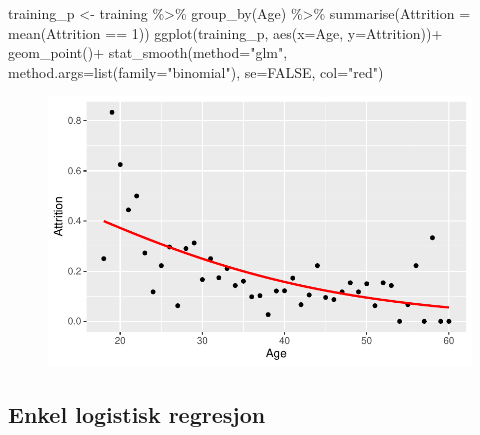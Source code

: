 \documentclass[
  letterpaper,
  DIV=11,
  numbers=noendperiod]{scrreprt}
\newenvironment{Shaded}{\begin{snugshade}}{\end{snugshade}}
\newcommand{\AttributeTok}[1]{\textcolor[rgb]{0.40,0.45,0.13}{#1}}
\newcommand{\ConstantTok}[1]{\textcolor[rgb]{0.56,0.35,0.01}{#1}}
\newcommand{\DecValTok}[1]{\textcolor[rgb]{0.68,0.00,0.00}{#1}}
\newcommand{\FunctionTok}[1]{\textcolor[rgb]{0.28,0.35,0.67}{#1}}
\newcommand{\NormalTok}[1]{\textcolor[rgb]{0.00,0.23,0.31}{#1}}
\newcommand{\OtherTok}[1]{\textcolor[rgb]{0.00,0.23,0.31}{#1}}
\newcommand{\SpecialCharTok}[1]{\textcolor[rgb]{0.37,0.37,0.37}{#1}}
\newcommand{\StringTok}[1]{\textcolor[rgb]{0.13,0.47,0.30}{#1}}
\theoremstyle{definition}
\theoremstyle{remark}
\begin{document}
\begin{Shaded}
\begin{Highlighting}[]
\NormalTok{training\_p }\OtherTok{\textless{}{-}}\NormalTok{ training }\SpecialCharTok{\%\textgreater{}\%} 
  \FunctionTok{group\_by}\NormalTok{(Age) }\SpecialCharTok{\%\textgreater{}\%} 
  \FunctionTok{summarise}\NormalTok{(}\AttributeTok{Attrition =} \FunctionTok{mean}\NormalTok{(Attrition }\SpecialCharTok{==} \DecValTok{1}\NormalTok{)) }
\FunctionTok{ggplot}\NormalTok{(training\_p, }\FunctionTok{aes}\NormalTok{(}\AttributeTok{x=}\NormalTok{Age, }\AttributeTok{y=}\NormalTok{Attrition))}\SpecialCharTok{+} 
  \FunctionTok{geom\_point}\NormalTok{()}\SpecialCharTok{+} 
  \FunctionTok{stat\_smooth}\NormalTok{(}\AttributeTok{method=}\StringTok{"glm"}\NormalTok{, }\AttributeTok{method.args=}\FunctionTok{list}\NormalTok{(}\AttributeTok{family=}\StringTok{"binomial"}\NormalTok{), }\AttributeTok{se=}\ConstantTok{FALSE}\NormalTok{, }\AttributeTok{col=}\StringTok{"red"}\NormalTok{) }
\end{Highlighting}
\end{Shaded}

\begin{figure}[H]

{\centering \includegraphics{./logistisk_regresjon_files/figure-pdf/unnamed-chunk-11-1.pdf}

}

\end{figure}

\hypertarget{enkel-logistisk-regresjon}{%
\subsection{Enkel logistisk regresjon}\label{enkel-logistisk-regresjon}}
\end{document}
